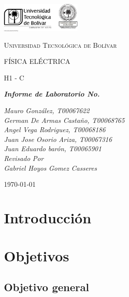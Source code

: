 \documentclass[twocolumn, 12pt]{article}
\begin{document}
\begin{titlepage}
	\centering
	\includegraphics[width=0.3\textwidth]{Images/logo_utb.png}\par\vspace{1cm}
	{\scshape\LARGE Universidad Tecnológica de Bolívar \par}
	\vspace{1cm}

	{\scshape\Large FÍSICA ELÉCTRICA \par}
	\vspace{.2cm}

	{\scshape\Large H1 - C \par}
	\vspace{1cm}
	\slshape {\Large \bfseries{}Informe de Laboratorio No.  \\}
	\vspace{1cm}

	\slshape {\itshape{} Mauro González, T00067622 \\}
	\slshape {\itshape{} German De Armas Castaño, T00068765 \\}
	\slshape {\itshape{} Angel Vega Rodriguez, T00068186 \\}
	\slshape {\itshape{} Juan Jose Osorio Ariza, T00067316 \\}
	\slshape {\itshape{} Juan Eduardo barón, T00065901 \\}
	\vfill
	Revisado Por \\
	Gabriel Hoyos Gomez Casseres\\
	{\large \today\par}
\end{titlepage}

\section{Introducción}


\section{Objetivos}

\subsection{Objetivo general}
\end{document}
